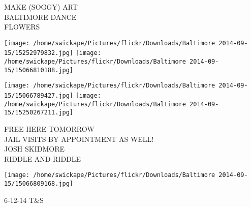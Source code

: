 \documentclass[10pt,letterpaper]{article}
\begin{document}
MAKE (SOGGY) ART\\
BALTIMORE DANCE\\
FLOWERS\\
\pagebreak

\texttt{[image: /home/swickape/Pictures/flickr/Downloads/Baltimore 2014-09-15/15252979832.jpg]}
\texttt{[image: /home/swickape/Pictures/flickr/Downloads/Baltimore 2014-09-15/15066810188.jpg]}

\texttt{[image: /home/swickape/Pictures/flickr/Downloads/Baltimore 2014-09-15/15066789427.jpg]}
\texttt{[image: /home/swickape/Pictures/flickr/Downloads/Baltimore 2014-09-15/15250267211.jpg]}

FREE HERE TOMORROW\\
JAIL VISITS BY APPOINTMENT AS WELL!\\
JOSH SKIDMORE\\
RIDDLE AND RIDDLE\\
\pagebreak

\texttt{[image: /home/swickape/Pictures/flickr/Downloads/Baltimore 2014-09-15/15066809168.jpg]}

6{-}12{-}14 T\&S\\
\pagebreak
\end{document}
